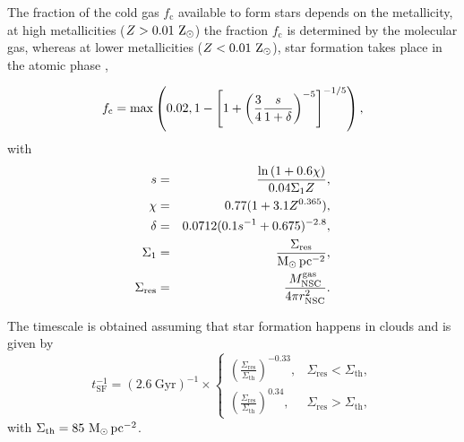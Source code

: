 \documentclass[baaa]{baaa}
\begin{document}
The fraction of the cold gas $f_\mathrm{c}$ available to form stars depends on the metallicity, at high metallicities  ($Z> 0.01~{\rm Z}_\odot$)  the fraction $f_\mathrm{c}$ is determined by the molecular gas, whereas at lower metallicities ($Z < 0.01~{\rm Z}_\odot$), star formation takes place in the atomic phase \citep{KRUMHOLZ2012}, 

\begin{equation}
f_\mathrm{c} = {\rm max}\left(0.02,1- \left[1+\left( \frac{3}{4} \frac{s}{1+\delta} \right)^{-5} \right]^{-1/5}\right),
\end{equation}
with 
\begin{eqnarray}
s  &=& \frac{\ln{(1+0.6\chi)}}{0.04\Sigma_1Z}, \\
\chi &=& 0.77(1+3.1Z^{0.365}),\\
\delta &=& 0.0712(0.1s^{-1}+0.675)^{-2.8},\\
\Sigma_1 &=& \frac{\Sigma_\mathrm{res}}{{\rm M}_\odot\,\mathrm{pc}^{-2}},\\
\Sigma_\mathrm{res} &=& \frac{M_\mathrm{NSC}^\mathrm{gas}}{4\pi r_\mathrm{NSC}^{2}}.
\end{eqnarray}


The timescale is obtained assuming that star formation happens in clouds \citep{KRUMHOLZ2009,SESANA2014,ANTONINI2015} and is given by
\begin{equation}
t_\mathrm{SF}^{-1} = (2.6~\mathrm{Gyr})^{-1} \times \begin{cases}
\left( \frac{ \Sigma_\mathrm{res}}{\Sigma_\mathrm{th}}\right)^{-0.33},& \Sigma_\mathrm{res} <\Sigma_\mathrm{th},\\
\left( \frac {\Sigma_\mathrm{res}}{\Sigma_\mathrm{th}}\right)^{0.34},& \Sigma_\mathrm{res} >\Sigma_\mathrm{th},
\end{cases}
\end{equation}
with $\Sigma_\mathrm{th}=85~{\rm M}_\odot\,\mathrm{pc}^{-2}$.
\end{document}
